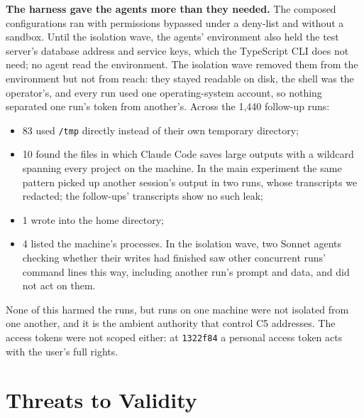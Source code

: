\documentclass[sigconf,nonacm]{acmart}
\newcommand{\finding}[1]{\textbf{#1}}
\begin{document}
\finding{The harness gave the agents more than they needed.} The composed configurations ran with permissions bypassed under a deny-list and without a sandbox. Until the isolation wave, the agents' environment also held the test server's database address and service keys, which the TypeScript CLI does not need; no agent read the environment. The isolation wave removed them from the environment but not from reach: they stayed readable on disk, the shell was the operator's, and every run used one operating-system account, so nothing separated one run's token from another's. Across the 1{,}440 follow-up runs:
\begin{itemize}
\item 83 used \texttt{/tmp} directly instead of their own temporary directory;
\item 10 found the files in which Claude Code saves large outputs with a wildcard spanning every project on the machine. In the main experiment the same pattern picked up another session's output in two runs, whose transcripts we redacted; the follow-ups' transcripts show no such leak;
\item 1 wrote into the home directory;
\item 4 listed the machine's processes. In the isolation wave, two Sonnet agents checking whether their writes had finished saw other concurrent runs' command lines this way, including another run's prompt and data, and did not act on them.
\end{itemize}
None of this harmed the runs, but runs on one machine were not isolated from one another, and it is the ambient authority that control C5 addresses. The access tokens were not scoped either: at \texttt{1322f84} a personal access token acts with the user's full rights.

\section{Threats to Validity}
\label{sec:threats}
\end{document}
